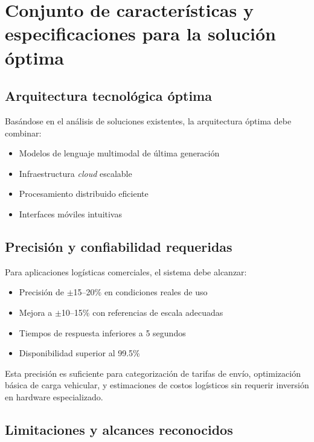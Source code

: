 \section{Conjunto de características y especificaciones para la solución óptima}

\subsection{Arquitectura tecnológica óptima}

Basándose en el análisis de soluciones existentes, la arquitectura óptima debe combinar:

\begin{itemize}
    \item Modelos de lenguaje multimodal de última generación
    \item Infraestructura \textit{cloud} escalable
    \item Procesamiento distribuido eficiente
    \item Interfaces móviles intuitivas
\end{itemize}

\subsection{Precisión y confiabilidad requeridas}

Para aplicaciones logísticas comerciales, el sistema debe alcanzar:

\begin{itemize}
    \item Precisión de $\pm$15--20\% en condiciones reales de uso
    \item Mejora a $\pm$10--15\% con referencias de escala adecuadas
    \item Tiempos de respuesta inferiores a 5 segundos
    \item Disponibilidad superior al 99.5\%
\end{itemize}

Esta precisión es suficiente para categorización de tarifas de envío, optimización básica de carga vehicular, y estimaciones de costos logísticos sin requerir inversión en hardware especializado.

\subsection{Limitaciones y alcances reconocidos}


